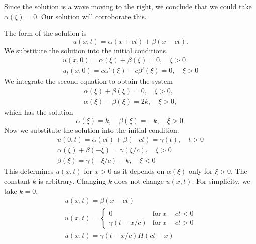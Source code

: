 {%
\begin{Solution}
  Since the solution is a wave moving to the right, we conclude that 
  we could take $\alpha(\xi) = 0$.  Our solution will corroborate this.

  The form of the solution is
  \[
  u(x,t) = \alpha(x+ct) + \beta(x-ct).  
  \]
  We substitute the solution into the initial conditions.
  \begin{gather*}
    u(x,0) = \alpha(\xi) + \beta(\xi) = 0, \quad \xi > 0 \\
    u_t(x,0) = c \alpha'(\xi) - c \beta'(\xi) = 0, \quad \xi > 0
  \end{gather*}
  We integrate the second equation to obtain the system
  \begin{gather*}
    \alpha(\xi) + \beta(\xi) = 0, \quad \xi > 0, \\
    \alpha(\xi) - \beta(\xi) = 2 k, \quad \xi > 0,
  \end{gather*}
  which has the solution
  \[
  \alpha(\xi) = k, \quad \beta(\xi) = -k, \quad \xi > 0.
  \]
  Now we substitute the solution into the initial condition.
  \begin{gather*}
    u(0,t) = \alpha(c t) + \beta(- c t) = \gamma(t), \quad t > 0 \\
    \alpha(\xi) + \beta(-\xi) = \gamma(\xi/c), \quad \xi > 0 \\
    \beta(\xi) = \gamma(-\xi/c) - k, \quad \xi < 0
  \end{gather*}
  This determines $u(x,t)$ for $x > 0$ as it depends on
  $\alpha(\xi)$ only for $\xi > 0$.  The constant $k$ is arbitrary.
  Changing $k$ does not change $u(x,t)$.  For simplicity, we take
  $k = 0$.  
  \begin{gather*}
    u(x,t) = \beta(x - c t) \\
    u(x,t) = \begin{cases}
      0 &\mathrm{for}\ x - c t < 0 \\
      \gamma(t - x/c) &\mathrm{for}\ x - c t > 0
    \end{cases} \\
    \boxed{
      u(x,t) = \gamma(t - x/c) H(c t - x)
      }
  \end{gather*}
\end{Solution}






}
